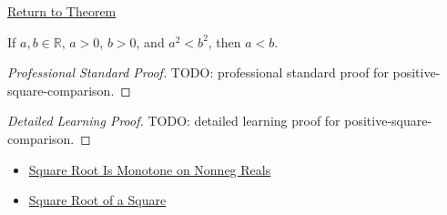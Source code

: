 \newpage
{}
\label{prf:positive-square-comparison}

\begin{remark*}[Return]
\hyperref[thm:positive-square-comparison]{Return to Theorem}
\end{remark*}

\begin{theorem*}
If $a,b\in\mathbb{R}$, $a>0$, $b>0$, and $a^2<b^2$, then $a<b$.
\end{theorem*}

\begin{proof}[Professional Standard Proof]
\LRAProofBodyStart
TODO: professional standard proof for positive-square-comparison.
\end{proof}

\begin{proof}[Detailed Learning Proof]
\LRAProofBodyStart
TODO: detailed learning proof for positive-square-comparison.
\end{proof}

\begin{remark*}
\end{remark*}

\begin{dependencies}
\begin{itemize}
  \item \hyperref[thm:ineq-square-root-monotone]{Square Root Is Monotone on Nonneg Reals}
  \item \hyperref[thm:sqrt-of-square-absolute-value]{Square Root of a Square}
\end{itemize}
\end{dependencies}

\clearpage


